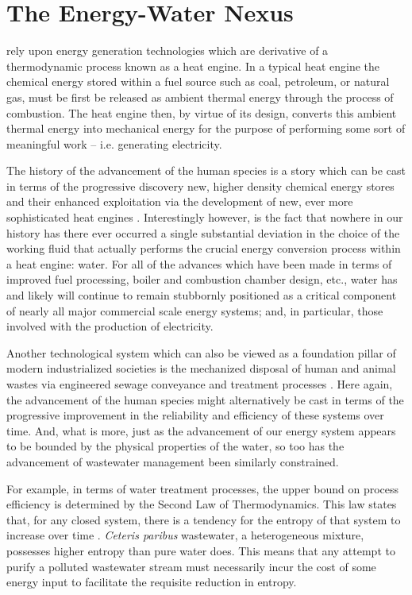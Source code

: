 \section{The Energy-Water Nexus}
  
 rely upon energy generation technologies which are derivative of a thermodynamic process known as a heat engine. In a typical heat engine the chemical energy stored within a fuel source such as coal, petroleum, or natural gas, must be first be released as ambient thermal energy through the process of combustion. The heat engine then, by virtue of its design, converts this ambient thermal energy into mechanical energy for the purpose of performing some sort of meaningful work -- i.e. generating electricity.
    
    The history of the advancement of the human species is a story which can be cast in terms of the progressive discovery new, higher density chemical energy stores and their enhanced exploitation via the development of new, ever more sophisticated heat engines \cite{Grubler2003,Grubler2010}. Interestingly however, is the fact that nowhere in our history has there ever occurred a single substantial deviation in the choice of the working fluid that actually performs the crucial energy conversion process within a heat engine: water. For all of the advances which have been made in terms of improved fuel processing, boiler and combustion chamber design, etc., water has and likely will continue to remain stubbornly positioned as a critical component of nearly all major commercial scale energy systems; and, in particular, those involved with the production of electricity. 
    
    Another technological system which can also be viewed as a foundation pillar of modern industrialized societies is the mechanized disposal of human and animal wastes via engineered sewage conveyance and treatment processes \cite{Angelakis2014}. Here again, the advancement of the human species might alternatively be cast in terms of the progressive improvement in the reliability and efficiency of these systems over time. And, what is more, just as the advancement of our energy system appears to be bounded by the physical properties of the water, so too has the advancement of wastewater management been similarly constrained. 
        
    For example, in terms of water treatment processes, the upper bound on process efficiency is determined by the Second Law of Thermodynamics. This law states that, for any closed system, there is a tendency for the entropy of that system to increase over time \cite{Jaynes1996}. \textit{Ceteris paribus} wastewater, a heterogeneous mixture, possesses higher entropy than pure water does. This means that any attempt to purify a polluted wastewater stream must necessarily incur the cost of some energy input to facilitate the requisite reduction in entropy. 
    

